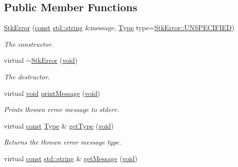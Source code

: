 \subsection*{Public Member Functions}
\begin{DoxyCompactItemize}
\item 
\hyperlink{class_nyq_1_1_stk_error_a554f081b8cee2c249e2ffeda34199f44}{Stk\+Error} (\hyperlink{getopt1_8c_a2c212835823e3c54a8ab6d95c652660e}{const} \hyperlink{test__lib_f_l_a_c_2format_8c_ab02026ad0de9fb6c1b4233deb0a00c75}{std\+::string} \&message, \hyperlink{class_nyq_1_1_stk_error_a5fde28aabab32abdb02b1078542bd3e8}{Type} type=\hyperlink{class_nyq_1_1_stk_error_a5fde28aabab32abdb02b1078542bd3e8a88bc81315f8a933262d0541a770d005b}{Stk\+Error\+::\+U\+N\+S\+P\+E\+C\+I\+F\+I\+ED})
\begin{DoxyCompactList}\small\item\em The constructor. \end{DoxyCompactList}\item 
virtual \hyperlink{class_nyq_1_1_stk_error_a0d194c724e25b8d16a1e32bce3014ba4}{$\sim$\+Stk\+Error} (\hyperlink{sound_8c_ae35f5844602719cf66324f4de2a658b3}{void})
\begin{DoxyCompactList}\small\item\em The destructor. \end{DoxyCompactList}\item 
virtual \hyperlink{sound_8c_ae35f5844602719cf66324f4de2a658b3}{void} \hyperlink{class_nyq_1_1_stk_error_a42a2808d5a9c6b758386b0271c1914cd}{print\+Message} (\hyperlink{sound_8c_ae35f5844602719cf66324f4de2a658b3}{void})
\begin{DoxyCompactList}\small\item\em Prints thrown error message to stderr. \end{DoxyCompactList}\item 
virtual \hyperlink{getopt1_8c_a2c212835823e3c54a8ab6d95c652660e}{const} \hyperlink{class_nyq_1_1_stk_error_a5fde28aabab32abdb02b1078542bd3e8}{Type} \& \hyperlink{class_nyq_1_1_stk_error_ad59168c42c406d89d7d480407be197f5}{get\+Type} (\hyperlink{sound_8c_ae35f5844602719cf66324f4de2a658b3}{void})
\begin{DoxyCompactList}\small\item\em Returns the thrown error message type. \end{DoxyCompactList}\item 
virtual \hyperlink{getopt1_8c_a2c212835823e3c54a8ab6d95c652660e}{const} \hyperlink{test__lib_f_l_a_c_2format_8c_ab02026ad0de9fb6c1b4233deb0a00c75}{std\+::string} \& \hyperlink{class_nyq_1_1_stk_error_ad64247d338315a81129a24d4f5428a52}{get\+Message} (\hyperlink{sound_8c_ae35f5844602719cf66324f4de2a658b3}{void})

\end{DoxyCompactItemize}
